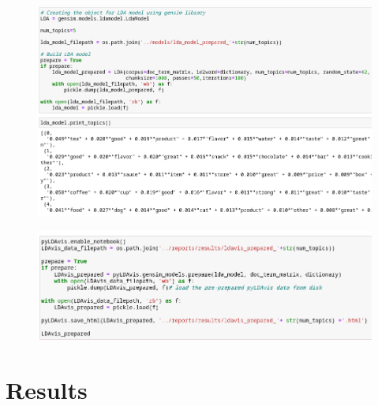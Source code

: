 \documentclass{beamer}
\begin{document}
\begin{frame}
    \begin{figure}
        \includegraphics[width=\textwidth]{../figures/topic_lda.png}
    \end{figure}
\end{frame}

\begin{frame}
    \begin{figure}
        \includegraphics[width=\textwidth]{../figures/topic_gensim.png}
    \end{figure}
\end{frame}

\section{Results}
\end{document}
